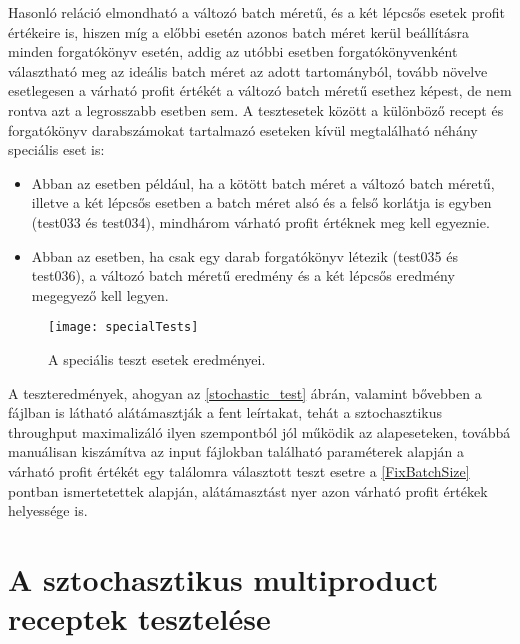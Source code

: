 Hasonló reláció elmondható a változó batch méretű, és a két lépcsős esetek profit értékeire is, hiszen míg a előbbi esetén azonos batch méret kerül beállításra minden forgatókönyv esetén, addig az utóbbi esetben forgatókönyvenként választható meg az ideális batch méret az adott tartományból, tovább növelve esetlegesen a várható profit értékét a változó batch méretű esethez képest, de nem rontva azt a legrosszabb esetben sem.
A tesztesetek között a különböző recept és forgatókönyv darabszámokat tartalmazó eseteken kívül megtalálható néhány speciális eset is:
\begin{itemize}
\item Abban az esetben például, ha a kötött batch méret a változó batch méretű, illetve a két lépcsős esetben a batch méret alsó és a felső korlátja is egyben (test033 és test034), mindhárom várható profit értéknek meg kell egyeznie.
\item Abban az esetben, ha csak egy darab forgatókönyv létezik (test035 és test036), a változó batch méretű eredmény és a két lépcsős eredmény megegyező kell legyen.
\end{itemize}
\begin{figure}[H]
\begin{center}
\texttt{[image: specialTests]}
\caption{A speciális teszt esetek eredményei.}
\label{special_tests}
\end{center}
\end{figure} 
A teszteredmények, ahogyan az \ref{stochastic_test} ábrán, valamint bővebben a  fájlban is látható alátámasztják a fent leírtakat, tehát a sztochasztikus throughput maximalizáló ilyen szempontból jól működik az alapeseteken, továbbá manuálisan kiszámítva az input fájlokban található paraméterek alapján a várható profit értékét egy találomra választott teszt esetre a \ref{FixBatchSize} pontban ismertetettek alapján, alátámasztást nyer azon várható profit értékek helyessége is.
\pagebreak
\section{A sztochasztikus multiproduct receptek tesztelése}